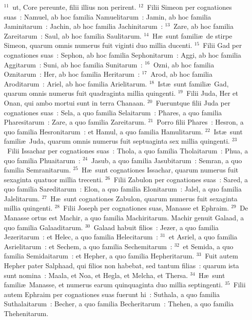 ${}^{11}$~ut, Core pereunte, filii illius non perirent.
${}^{12}$~Filii Simeon per cognationes suas~: Namuel, ab hoc familia Namuelitarum~: Jamin, ab hoc familia Jaminitarum~: Jachin, ab hoc familia Jachinitarum~:
${}^{13}$~Zare, ab hoc familia Zareitarum~: Saul, ab hoc familia Saulitarum.
${}^{14}$~H\ae\ sunt famili\ae\ de stirpe Simeon, quarum omnis numerus fuit viginti duo millia ducenti.
${}^{15}$~Filii Gad per cognationes suas~: Sephon, ab hoc familia Sephonitarum~: Aggi, ab hoc familia Aggitarum~: Suni, ab hoc familia Sunitarum~:
${}^{16}$~Ozni, ab hoc familia Oznitarum~: Her, ab hoc familia Heritarum~:
${}^{17}$~Arod, ab hoc familia Aroditarum~: Ariel, ab hoc familia Arielitarum.
${}^{18}$~Ist\ae\ sunt famili\ae\ Gad, quarum omnis numerus fuit quadraginta millia quingenti.
${}^{19}$~Filii Juda, Her et Onan, qui ambo mortui sunt in terra Chanaan.
${}^{20}$~Fueruntque filii Juda per cognationes suas~: Sela, a quo familia Selaitarum~: Phares, a quo familia Pharesitarum~: Zare, a quo familia Zareitarum.
${}^{21}$~Porro filii Phares~: Hesron, a quo familia Hesronitarum~: et Hamul, a quo familia Hamulitarum.
${}^{22}$~Ist\ae\ sunt famili\ae\ Juda, quarum omnis numerus fuit septuaginta sex millia quingenti.
${}^{23}$~Filii Issachar per cognationes suas~: Thola, a quo familia Tholaitarum~: Phua, a quo familia Phuaitarum~:
${}^{24}$~Jasub, a quo familia Jasubitarum~: Semran, a quo familia Semranitarum.
${}^{25}$~H\ae\ sunt cognationes Issachar, quarum numerus fuit sexaginta quatuor millia trecenti.
${}^{26}$~Filii Zabulon per cognationes suas~: Sared, a quo familia Sareditarum~: Elon, a quo familia Elonitarum~: Jalel, a quo familia Jalelitarum.
${}^{27}$~H\ae\ sunt cognationes Zabulon, quarum numerus fuit sexaginta millia quingenti.
${}^{28}$~Filii Joseph per cognationes suas, Manasse et Ephraim.
${}^{29}$~De Manasse ortus est Machir, a quo familia Machiritarum. Machir genuit Galaad, a quo familia Galaaditarum.
${}^{30}$~Galaad habuit filios~: Jezer, a quo familia Jezeritarum~: et Helec, a quo familia Helecitarum~:
${}^{31}$~et Asriel, a quo familia Asrielitarum~: et Sechem, a quo familia Sechemitarum~:
${}^{32}$~et Semida, a quo familia Semidaitarum~: et Hepher, a quo familia Hepheritarum.
${}^{33}$~Fuit autem Hepher pater Salphaad, qui filios non habebat, sed tantum filias~: quarum ista sunt nomina~: Maala, et Noa, et Hegla, et Melcha, et Thersa.
${}^{34}$~H\ae\ sunt famili\ae\ Manasse, et numerus earum quinquaginta duo millia septingenti.
${}^{35}$~Filii autem Ephraim per cognationes suas fuerunt hi~: Suthala, a quo familia Suthalaitarum~: Becher, a quo familia Becheritarum~: Thehen, a quo familia Thehenitarum.
